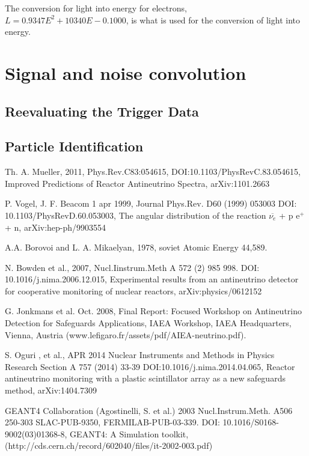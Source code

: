 \documentclass[12pt,a4paper]{article}
\begin{document}
The conversion for light into energy for electrons, $L = 0.9347E^2 + 10340E - 0.1000$, is what is used for the conversion of light into energy. 

\section{Signal and noise convolution}
\subsection{Reevaluating the Trigger Data}
\subsection{Particle Identification}

\begin{thebibliography}{9}
Th. A. Mueller, 2011, Phys.Rev.C83:054615, DOI:10.1103/PhysRevC.83.054615, Improved Predictions of Reactor Antineutrino Spectra, arXiv:1101.2663

P. Vogel, J. F. Beacom 1 apr 1999, Journal Phys.Rev. D60 (1999) 053003 DOI: 10.1103/PhysRevD.60.053003, The angular distribution of the reaction $\overline{\nu_e}$ + p \rightarrow e$^+$ + n, arXiv:hep-ph/9903554 

A.A. Borovoi and L. A. Mikaelyan, 1978, soviet Atomic Energy 44,589.

N. Bowden et al., 2007, Nucl.Iinstrum.Meth A 572 (2)  985 998. DOI: 10.1016/j.nima.2006.12.015, Experimental results from an antineutrino detector for cooperative monitoring of nuclear reactors, arXiv:physics/0612152

G. Jonkmans et al. Oct. 2008, Final Report: Focused Workshop on Antineutrino Detection for Safeguards Applications, IAEA Workshop, IAEA Headquarters, Vienna, Austria (www.lefigaro.fr/assets/pdf/AIEA-neutrino.pdf).

S. Oguri , et al., APR 2014 Nuclear Instruments and Methods in Physics Research Section A 757 (2014) 33-39 DOI:10.1016/j.nima.2014.04.065, Reactor antineutrino monitoring with a plastic scintillator array as a new safeguards method, arXiv:1404.7309

GEANT4 Collaboration (Agostinelli, S. et al.) 2003  Nucl.Instrum.Meth. A506 250-303 SLAC-PUB-9350, FERMILAB-PUB-03-339. DOI: 10.1016/S0168-9002(03)01368-8, GEANT4: A Simulation toolkit, (http://cds.cern.ch/record/602040/files/it-2002-003.pdf)


\end{thebibliography}
\end{document}
